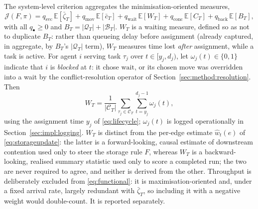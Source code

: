 \documentclass[../main.tex]{subfiles}
\begin{document}
The system-level criterion aggregates the minimisation-oriented measures,
\begin{equation}
  \mathcal{J}(F,\pi) = q_{\mathrm{svc}}\, \mathbb{E}[\bar{\zeta}_T]
                     + q_{\mathrm{mov}}\, \mathbb{E}[\bar{c}_T]
                     + q_{\mathrm{wait}}\, \mathbb{E}[W_T]
                     + q_{\mathrm{conc}}\, \mathbb{E}[C_T]
                     + q_{\mathrm{back}}\, \mathbb{E}[B_T],
  \label{eq:functional}
\end{equation}
with all $q_\bullet \ge 0$ and $B_T = |\mathcal{Q}_T| + |\mathcal{B}_T|$. $W_T$ is %
a waiting measure, defined so as not to duplicate $B_T$: rather than queueing
delay before assignment (already captured, in aggregate, by $B_T$'s $|\mathcal{Q}_T|$
term), $W_T$ measures time lost \emph{after} assignment, while a task is
active. For agent $i$ serving task $\tau_j$ over $t \in [y_j, d_j)$, let
$\omega_j(t) \in \{0,1\}$ indicate that $i$ is \emph{blocked} at $t$: it chose
$\mathrm{wait}$, or its chosen move was overridden into a wait by the
conflict-resolution operator of Section~\ref{sec:method:resolution}. Then
\begin{equation}
  W_T = \frac{1}{|\mathcal{C}_T|} \sum_{\tau_j \in \mathcal{C}_T}
        \sum_{t=y_j}^{d_j - 1} \omega_j(t) ,
  \label{eq:waiting}
\end{equation}
using the assignment time $y_j$ of \eqref{eq:lifecycle}; $\omega_j(t)$ is logged
operationally in Section~\ref{sec:impl:logging}. $W_T$ is distinct from the
per-edge estimate $\hat{w}_t(e)$ of \eqref{eq:storageupdate}: the latter is a
forward-looking, causal estimate of downstream contention used only to steer the
storage rule $F$, whereas $W_T$ is a backward-looking, realised summary statistic
used only to score a completed run; the two are never required to agree, and
neither is derived from the other. Throughput is deliberately excluded from
\eqref{eq:functional}: it is maximisation-oriented and, under a fixed arrival
rate, largely redundant with $\bar{\zeta}_T$, so including it with a negative
weight would double-count. It is reported separately.
\end{document}
